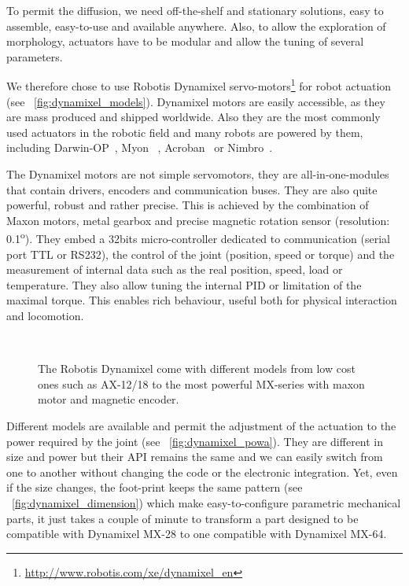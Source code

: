 
To permit the diffusion, we need off-the-shelf and stationary solutions, easy to assemble, easy-to-use and available anywhere. Also, to allow the exploration of morphology, actuators have to be modular and allow the tuning of several parameters.

We therefore chose to use Robotis Dynamixel servo-motors\footnote{\url{http://www.robotis.com/xe/dynamixel_en}} for robot actuation (see \figurename~\ref{fig:dynamixel_models}). Dynamixel motors are easily accessible, as they are mass produced and shipped worldwide. Also they are the most commonly used actuators in the robotic field and many robots are powered by them, including Darwin-OP~\parencite{ha2011development}, Myon~\parencite{hild2012myon} , Acroban~\parencite{ly2011bio} or Nimbro~\parencite{schwarznimbro}.

The Dynamixel motors are not simple servomotors, they are all-in-one-modules that contain drivers, encoders and communication buses. They are also quite powerful, robust and rather precise. This is achieved by the combination of Maxon motors, metal gearbox and precise magnetic rotation sensor (resolution: 0.1\textsuperscript{o}). They embed a 32bits micro-controller dedicated to communication (serial port TTL or RS232), the control of the joint (position, speed or torque) and the measurement of internal data such as the real position, speed, load or temperature. They also allow tuning the internal PID or limitation of the maximal torque. This enables rich behaviour, useful both for physical interaction and locomotion.


\begin{figure}[tb]
\centering
    \hfil
    \\
    \caption{The Robotis Dynamixel come with different models from low cost ones such as AX-12/18 to the most powerful MX-series with maxon motor and magnetic encoder.}
    \label{fig:dynamixel_serie}
\end{figure}

Different models are available and permit the adjustment of the actuation to the power required by the joint (see \figurename~\ref{fig:dynamixel_powa}). They are different in size and power but their API remains the same and we can easily switch from one to another without changing the code or the electronic integration. Yet, even if the size changes, the foot-print keeps the same pattern (see \figurename~\ref{fig:dynamixel_dimension}) which make easy-to-configure parametric mechanical parts, it just takes a couple of minute to transform a part designed to be compatible with Dynamixel MX-28 to one compatible with Dynamixel MX-64.



